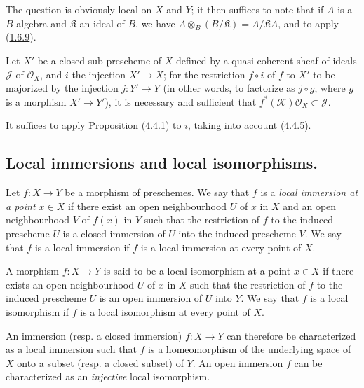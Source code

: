 The question is obviously local on $X$ and $Y$; it then suffices to
note that if $A$ is a $B$-algebra and $\mathfrak{K}$ an ideal of $B$,
we have $A\otimes_B(B/\mathfrak{K})=A/\mathfrak{K}A$, and to apply
(\hyperref[I.1.6.9]{1.6.9}).

\begin{corollary}[4.4.6]
\label{I.4.4.6}
Let $X'$ be a closed sub-prescheme of $X$ defined by a quasi-coherent
sheaf of ideals $\mathscr{J}$ of $\mathscr{O}_X$, and $i$ the injection
$X'\to X$; for the restriction $f\circ i$ of $f$ to $X'$ to be majorized
by the injection $j:Y'\to Y$ \textup{(in other words, to factorize as $j\circ g$,
where $g$ is a morphism $X'\to Y'$)}, it is necessary and sufficient that
$f^*(\mathscr{K})\mathscr{O}_X\subset\mathscr{J}$.
\end{corollary}

It suffices to apply Proposition (\hyperref[I.4.4.1]{4.4.1}) to $i$, taking
into account (\hyperref[I.4.4.5]{4.4.5}).

\subsection{Local immersions and local isomorphisms.}
\label{subsection:I.4.5}

\begin{definition}[4.5.1]
\label{I.4.5.1}
Let $f:X\to Y$ be a morphism of preschemes. We say that $f$ is a
\emph{local immersion at a point $x\in X$} if there exist an open
neighbourhood $U$ of $x$ in $X$ and an open neighbourhood $V$ of $f(x)$ in $Y$
such that the restriction of $f$ to the induced prescheme $U$ is a closed
immersion of $U$ into the induced prescheme $V$. We say that $f$ is a local
immersion if $f$ is a local immersion at every point of $X$.
\end{definition}

\begin{definition}[4.5.2]
\label{I.4.5.2}
A morphism $f:X\to Y$ is said to be a local isomorphism at
a point $x\in X$ if there exists an open neighbourhood $U$ of $x$ in $X$ such
that the restriction of $f$ to the induced prescheme $U$ is an open immersion
of $U$ into $Y$. We say that $f$ is a local isomorphism if $f$ is a
local isomorphism at every point of $X$.
\end{definition}

\begin{env}[4.5.3]
\label{I.4.5.3}
An immersion (resp. a closed immersion) $f:X\to Y$ can therefore be
characterized as a local immersion such that $f$ is a homeomorphism
of the underlying space of $X$ onto a subset (resp. a closed subset) of
$Y$. An open immersion $f$ can be characterized as an \emph{injective} local
isomorphism.
\end{env}

